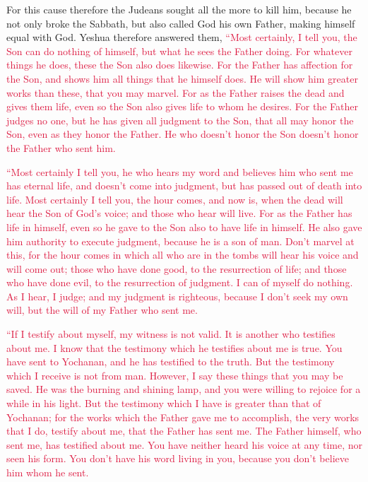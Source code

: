 \myverse{}For this cause therefore the Judeans sought all the more to kill
him, because he not only broke the Sabbath, but also called God his own Father, making himself equal with
God.
\myverse{}Yeshua therefore answered them,
\textcolor{crimson}{“Most certainly, I tell you, the Son can do nothing of himself, but what he sees the Father doing.
	For whatever things he does, these the Son also does likewise.
}
\myverse{}\textcolor{crimson}{For the Father has affection for the Son, and shows him all things that
	he himself does. He will show him greater works than these, that you may marvel.
}
\myverse{}\textcolor{crimson}{For as the Father raises the dead and gives them life, even so the Son
	also gives life to whom he desires.
}
\myverse{}\textcolor{crimson}{For the Father judges no one, but he has given all judgment to the Son,
}
\myverse{}\textcolor{crimson}{that all may honor the Son, even as they honor the Father. He who doesn’t
	honor the Son doesn’t honor the Father who sent him.}

\myverse{}\textcolor{crimson}{“Most certainly I tell you, he who hears my word and believes
	him who sent me has eternal life, and doesn’t come into judgment, but has passed out of death into life.
}
\myverse{}\textcolor{crimson}{Most certainly I tell you, the hour comes, and now is, when the dead will
	hear the Son of God’s voice; and those who hear will live.
}
\myverse{}\textcolor{crimson}{For as the Father has life in himself, even so he gave to the Son also
	to have life in himself.
}
\myverse{}\textcolor{crimson}{He also gave him authority to execute judgment, because he is a son of
	man.
}
\myverse{}\textcolor{crimson}{Don’t marvel at this, for the hour comes in which all who are in the tombs
	will hear his voice
}
\myverse{}\textcolor{crimson}{and will come out; those who have done good, to the resurrection of life;
	and those who have done evil, to the resurrection of judgment.
}
\myverse{}\textcolor{crimson}{I can of myself do nothing. As I hear, I judge; and my judgment is righteous,
	because I don’t seek my own will, but the will of my Father who sent me.}

\myverse{}\textcolor{crimson}{“If I testify about myself, my witness is not valid.} \myverse{}\textcolor{crimson}{It is another who testifies about me. I know that the testimony which he testifies about me is true.} \myverse{}\textcolor{crimson}{You have sent to Yochanan, and he has testified to the truth.} \myverse{}\textcolor{crimson}{But the testimony which I receive is not from man. However, I say these things that you may be saved.} \myverse{}\textcolor{crimson}{He was the burning and shining lamp, and you were willing to rejoice for a while in his light.}
\myverse{}\textcolor{crimson}{But the testimony which I have is greater than that of Yochanan; for the
	works which the Father gave me to accomplish, the very works that I do, testify about me, that the Father
	has sent me.
}
\myverse{}\textcolor{crimson}{The Father himself, who sent me, has testified about me. You have neither
	heard his voice at any time, nor seen his form.
}
\myverse{}\textcolor{crimson}{You don’t have his word living in you, because you don’t believe him whom
	he sent.}

